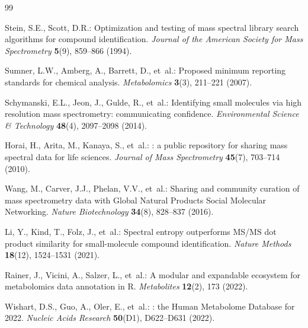 \documentclass[11pt,twoside,openright]{book}
\begin{document}
\begin{thebibliography}{99}
\small

Stein, S.E., Scott, D.R.:
\newblock Optimization and testing of mass spectral library search algorithms for compound identification.
\newblock \emph{Journal of the American Society for Mass Spectrometry} \textbf{5}(9), 859--866 (1994).
\newblock {}

Sumner, L.W., Amberg, A., Barrett, D., et~al.:
\newblock Proposed minimum reporting standards for chemical analysis.
\newblock \emph{Metabolomics} \textbf{3}(3), 211--221 (2007).
\newblock {}

Schymanski, E.L., Jeon, J., Gulde, R., et~al.:
\newblock Identifying small molecules via high resolution mass spectrometry: communicating confidence.
\newblock \emph{Environmental Science \& Technology} \textbf{48}(4), 2097--2098 (2014).
\newblock {}

Horai, H., Arita, M., Kanaya, S., et~al.:
: a public repository for sharing mass spectral data for life sciences.
\newblock \emph{Journal of Mass Spectrometry} \textbf{45}(7), 703--714 (2010).
\newblock {}

Wang, M., Carver, J.J., Phelan, V.V., et~al.:
\newblock Sharing and community curation of mass spectrometry data with {Global Natural Products Social Molecular Networking}.
\newblock \emph{Nature Biotechnology} \textbf{34}(8), 828--837 (2016).
\newblock {}

Li, Y., Kind, T., Folz, J., et~al.:
\newblock Spectral entropy outperforms {MS/MS} dot product similarity for small-molecule compound identification.
\newblock \emph{Nature Methods} \textbf{18}(12), 1524--1531 (2021).
\newblock {}

Rainer, J., Vicini, A., Salzer, L., et~al.:
\newblock A modular and expandable ecosystem for metabolomics data annotation in {R}.
\newblock \emph{Metabolites} \textbf{12}(2), 173 (2022).
\newblock {}

Wishart, D.S., Guo, A., Oler, E., et~al.:
: the Human Metabolome Database for 2022.
\newblock \emph{Nucleic Acids Research} \textbf{50}(D1), D622--D631 (2022).
\newblock {}


\end{thebibliography}
\end{document}
